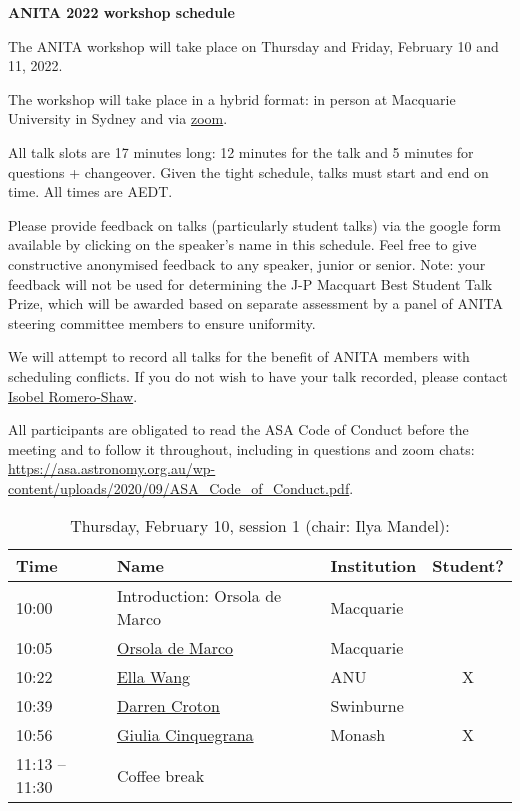 \documentclass[amsmath,onecolumn]{revtex4-1}
\begin{document}
\begin{center}
{\bf ANITA 2022 workshop schedule}\\
\end{center}
\vspace{0.2in}

The ANITA workshop will take place on Thursday and Friday, February 10 and 11, 2022.

The workshop will take place in a hybrid format: in person at Macquarie University in Sydney and via \href{https://uni-sydney.zoom.us/j/83045235112}{zoom}.  %

All talk slots are 17 minutes long: 12 minutes for the talk and 5 minutes for questions + changeover.  Given the tight schedule, talks must start and end on time.  All times are AEDT.

Please provide feedback on talks (particularly student talks) via the google form available by clicking on the speaker's name in this schedule.  Feel free to give constructive anonymised feedback to any speaker, junior or senior.  Note: your feedback will not be used for determining the J-P Macquart Best Student Talk Prize, which will be awarded based on separate assessment by a panel of ANITA steering committee members to ensure uniformity.

We will attempt to record all talks for the benefit of ANITA members with scheduling conflicts.  If you do not wish to have your talk recorded, please contact \href{mailto:isobel.romero-shaw@monash.edu}{Isobel Romero-Shaw}.

All participants are obligated to read the ASA Code of Conduct before the meeting and to follow it throughout, including in questions and zoom chats:
\url{https://asa.astronomy.org.au/wp-content/uploads/2020/09/ASA_Code_of_Conduct.pdf}.

\FloatBarrier

\begin{table}[!htbp]
	\centering
	\caption{Thursday, February 10, session 1 (chair: Ilya Mandel):}
\begin{tabular}{| l | l | l | c |}
	\hline
	Time & Name  & Institution & Student? \\ 		
	\hline
	10:00 & Introduction: Orsola de Marco & Macquarie & \\
	10:05 & \href{https://forms.gle/ZM8HoYqw1VRShzLNA}{Orsola de Marco} & Macquarie &  \\
	10:22 &  \href{https://forms.gle/bdRTLLNorm3c2uaN7}{Ella Wang} & ANU & X \\
	10:39 &  \href{https://forms.gle/2j1D6zZwaghz1tc26}{Darren Croton} & Swinburne & \\
	10:56 &  \href{https://forms.gle/ekxcKvycqdv4SmtL8}	{Giulia Cinquegrana} & Monash & X \\
	11:13 -- 11:30 & Coffee break & & \\
	\hline
\end{tabular}
\end{table}
\end{document}
